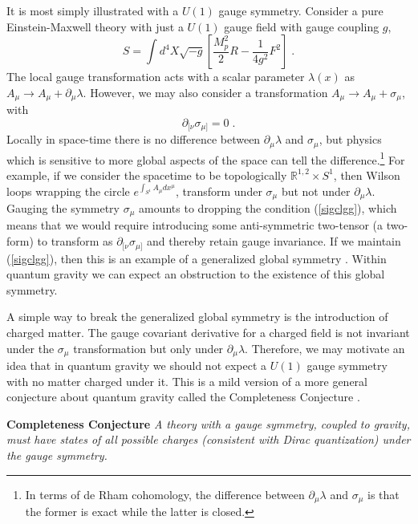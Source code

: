 \documentclass[11pt,a4paper]{article}
\numberwithin{equation}{section}
\numberwithin{table}{section}\setlength{\multlinegap}{25pt}
\newcommand{\be}{\begin{equation}}
\newcommand{\ee}{\end{equation}}
\begin{document}
It is most simply illustrated with a $U(1)$ gauge symmetry. Consider a pure Einstein-Maxwell theory with just a $U(1)$ gauge field with gauge coupling $g$,
\be
\label{ccem}
S = \int d^4X \sqrt{-g} \left[ \frac{M_p^{2}}{2} R - \frac{1}{4g^2} F^2 \right] \;.
\ee
The local gauge transformation acts with a scalar parameter $\lambda\left(x\right)$ as $A_{\mu} \rightarrow A_{\mu} + \partial_{\mu} \lambda$. However, we may also consider a transformation $A_{\mu} \rightarrow A_{\mu} + \sigma_{\mu}$, with
\be
\partial_{[\nu} \sigma_{\mu]}=0 \;.
\label{sigclgg}
\ee 
Locally in space-time there is no difference between $\partial_{\mu}\lambda$ and $\sigma_{\mu}$, but physics which is sensitive to more global aspects of the space can tell the difference.\footnote{In terms of de Rham cohomology, the difference between $\partial_{\mu}\lambda$ and $\sigma_{\mu}$ is that the former is exact while the latter is closed.} For example, if we consider the spacetime to be topologically $\mathbb{R}^{1,2}\times S^1$, then Wilson loops wrapping the circle $e^{\int_{S^1} A_{\mu} dx^{\mu}}$, transform under $\sigma_{\mu}$ but not under $\partial_{\mu} \lambda$. Gauging the symmetry $\sigma_{\mu}$ amounts to dropping the condition (\ref{sigclgg}), which means that we would require introducing some anti-symmetric two-tensor (a two-form) to transform as $\partial_{[\nu} \sigma_{\mu]}$ and thereby retain gauge invariance. If we maintain (\ref{sigclgg}), then this is an example of a generalized global symmetry \cite{Gaiotto:2014kfa}. Within quantum gravity we can expect an obstruction to the existence of this global symmetry. 

A simple way to break the generalized global symmetry is the introduction of charged matter. The gauge covariant derivative for a charged field is not invariant under the $\sigma_{\mu}$ transformation but only under $\partial_{\mu} \lambda$. Therefore, we may motivate an idea that in quantum gravity we should not expect a $U(1)$ gauge symmetry with no matter charged under it. This is a mild version of a more general conjecture about quantum gravity called the Completeness Conjecture \cite{Polchinski:2003bq}. 

\begin{tcolorbox}
{\bf Completeness Conjecture} \;\cite{Polchinski:2003bq}
{\it 
\newline
\newline
A theory with a gauge symmetry, coupled to gravity, must have states of all possible charges (consistent with Dirac quantization) under the gauge symmetry. 
}
\end{tcolorbox}
\end{document}
